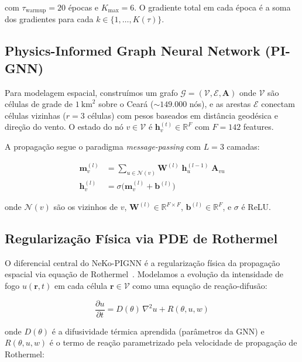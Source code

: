 com $\tau_{\text{warmup}} = 20$ épocas e $K_{\max} = 6$. O gradiente total em cada época é a soma dos gradientes para cada $k \in \{1,\dots,K(\tau)\}$.

\subsection{Physics-Informed Graph Neural Network (PI-GNN)}
\label{sec:pignn}

Para modelagem espacial, construímos um grafo $\mathcal{G} = (\mathcal{V}, \mathcal{E}, \mathbf{A})$ onde $\mathcal{V}$ são células de grade de $1~\text{km}^2$ sobre o Ceará ($\sim 149.000$ nós), e as arestas $\mathcal{E}$ conectam células vizinhas ($r = 3$ células) com pesos baseados em distância geodésica e direção do vento. O estado do nó $v \in \mathcal{V}$ é $\mathbf{h}_v^{(t)} \in \mathbb{R}^{F}$ com $F = 142$ features.

A propagação segue o paradigma \emph{message-passing} com $L = 3$ camadas:

\begin{align}
\mathbf{m}_v^{(l)} &= \sum_{u \in \mathcal{N}(v)} \mathbf{W}^{(l)} \; \mathbf{h}_u^{(l-1)} \; \mathbf{A}_{vu} \label{eq:message} \\
\mathbf{h}_v^{(l)} &= \sigma\!\bigl(\mathbf{m}_v^{(l)} + \mathbf{b}^{(l)}\bigr) \label{eq:update}
\end{align}

onde $\mathcal{N}(v)$ são os vizinhos de $v$, $\mathbf{W}^{(l)} \in \mathbb{R}^{F \times F}$, $\mathbf{b}^{(l)} \in \mathbb{R}^{F}$, e $\sigma$ é ReLU.

\subsection{Regularização Física via PDE de Rothermel}
\label{sec:rothermel-pde}

O diferencial central do NeKo-PIGNN é a regularização física da propagação espacial via equação de Rothermel~\cite{article:rothermel1972}. Modelamos a evolução da intensidade de fogo $u(\mathbf{r}, t)$ em cada célula $\mathbf{r} \in \mathcal{V}$ como uma equação de reação-difusão:

\begin{equation}
\frac{\partial u}{\partial t} = D(\theta)\,\nabla^2 u + R(\theta, u, w)
\label{eq:pde_rothermel}
\end{equation}

onde $D(\theta)$ é a difusividade térmica aprendida (parâmetros da GNN) e $R(\theta, u, w)$ é o termo de reação parametrizado pela velocidade de propagação de Rothermel:


